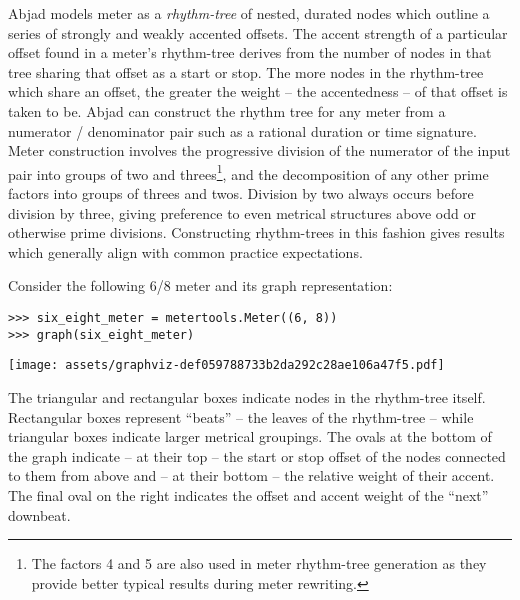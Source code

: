 Abjad models meter as a \emph{rhythm-tree} of nested, durated nodes which
outline a series of strongly and weakly accented offsets. The accent strength
of a particular offset found in a meter's rhythm-tree derives from the number
of nodes in that tree sharing that offset as a start or stop. The more nodes in
the rhythm-tree which share an offset, the greater the weight -- the
accentedness -- of that offset is taken to be. Abjad can construct the rhythm
tree for any meter from a numerator / denominator pair such as a rational
duration or time signature. Meter construction involves the progressive
division of the numerator of the input pair into groups of two and
threes\footnote{The factors 4 and 5 are also used in meter rhythm-tree
generation as they provide better typical results during meter rewriting.}, and
the decomposition of any other prime factors into groups of threes and twos.
Division by two always occurs before division by three, giving preference to
even metrical structures above odd or otherwise prime divisions. Constructing
rhythm-trees in this fashion gives results which generally align with common
practice expectations.

Consider the following 6/8 meter and its graph representation:

\begin{comment}
<abjad>
six_eight_meter = metertools.Meter((6, 8))
graph(six_eight_meter)
</abjad>
\end{comment}

\begin{abjadbookoutput}
\begin{singlespacing}
\vspace{-0.5\baselineskip}
\begin{lstlisting}
>>> six_eight_meter = metertools.Meter((6, 8))
>>> graph(six_eight_meter)
\end{lstlisting}
\noindent\texttt{[image: assets/graphviz-def059788733b2da292c28ae106a47f5.pdf]}
\end{singlespacing}
\end{abjadbookoutput}

\noindent The triangular and rectangular boxes indicate nodes in the
rhythm-tree itself. Rectangular boxes represent \enquote{beats} -- the leaves
of the rhythm-tree -- while triangular boxes indicate larger metrical
groupings. The ovals at the bottom of the graph indicate -- at their top -- the
start or stop offset of the nodes connected to them from above and -- at their
bottom -- the relative weight of their accent. The final oval on the right
indicates the offset and accent weight of the \enquote{next} downbeat.

